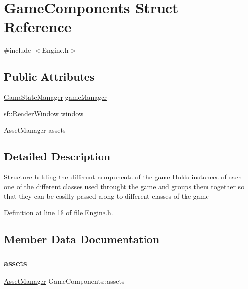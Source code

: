 \hypertarget{struct_game_components}{}\section{Game\+Components Struct Reference}
\label{struct_game_components}


{\ttfamily \#include $<$Engine.\+h$>$}

\subsection*{Public Attributes}
\begin{DoxyCompactItemize}
\item 
\mbox{\hyperlink{class_game_state_manager}{Game\+State\+Manager}} \mbox{\hyperlink{struct_game_components_a9ff8e64fce57ab014b3b7909d22261b1}{game\+Manager}}
\item 
sf\+::\+Render\+Window \mbox{\hyperlink{struct_game_components_a0a416384259309e866d443f495855d07}{window}}
\item 
\mbox{\hyperlink{class_asset_manager}{Asset\+Manager}} \mbox{\hyperlink{struct_game_components_ad2071710bf91aed4401f9b83377d4b36}{assets}}
\end{DoxyCompactItemize}


\subsection{Detailed Description}
Structure holding the different components of the game Holds instances of each one of the different classes used throught the game and groups them together so that they can be easilly passed along to different classes of the game 

Definition at line 18 of file Engine.\+h.



\subsection{Member Data Documentation}
\mbox{\label{struct_game_components_ad2071710bf91aed4401f9b83377d4b36}} 
\subsubsection{\texorpdfstring{assets}{assets}}
{\footnotesize\ttfamily \mbox{\hyperlink{class_asset_manager}{Asset\+Manager}} Game\+Components\+::assets}

